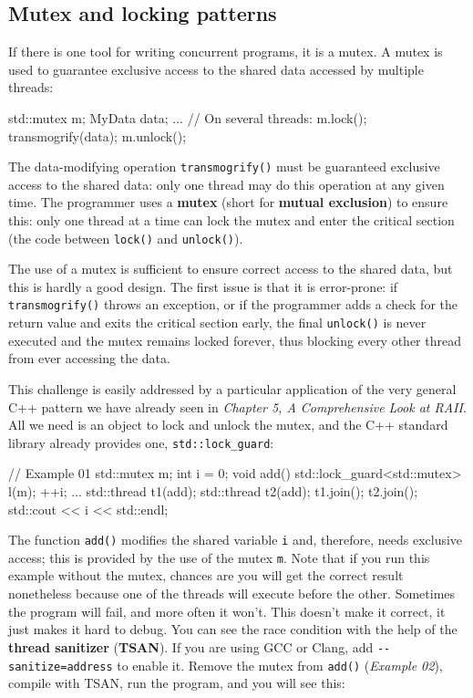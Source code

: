 \subsection{Mutex and locking patterns}

If there is one tool for writing concurrent programs, it is a mutex. A mutex is used to guarantee exclusive access to the shared data accessed by multiple threads:

\begin{code}
std::mutex m;
MyData data;
...
// On several threads:
m.lock();
transmogrify(data);
m.unlock();
\end{code}

The data-modifying operation \texttt{transmogrify()} must be guaranteed exclusive access to the shared data: only one thread may do this operation at any given time. The programmer uses a \textbf{mutex} (short for \textbf{mutual exclusion}) to ensure this: only one thread at a time can lock the mutex and enter the critical section (the code between \texttt{lock()} and \texttt{unlock()}).

The use of a mutex is sufficient to ensure correct access to the shared data, but this is hardly a good design. The first issue is that it is error-prone: if \texttt{transmogrify()} throws an exception, or if the programmer adds a check for the return value and exits the critical section early, the final \texttt{unlock()} is never executed and the mutex remains locked forever, thus blocking every other thread from ever accessing the data.

This challenge is easily addressed by a particular application of the very general C++ pattern we have already seen in \emph{Chapter 5, A Comprehensive Look at RAII}. All we need is an object to lock and unlock the mutex, and the C++ standard library already provides one, \texttt{std::lock\_guard}:

\begin{code}
// Example 01
std::mutex m;
int i = 0;
void add() {
  std::lock_guard<std::mutex> l(m);
  ++i;
}
...
std::thread t1(add);
std::thread t2(add);
t1.join();
t2.join();
std::cout << i << std::endl;
\end{code}

The function \texttt{add()} modifies the shared variable \texttt{i} and, therefore, needs exclusive access; this is provided by the use of the mutex \texttt{m}. Note that if you run this example without the mutex, chances are you will get the correct result nonetheless because one of the threads will execute before the other. Sometimes the program will fail, and more often it won't. This doesn't make it correct, it just makes it hard to debug. You can see the race condition with the help of the \textbf{thread sanitizer} (\textbf{TSAN}). If you are using GCC or Clang, add \texttt{-\/-sanitize=address} to enable it. Remove the mutex from \texttt{add()} (\emph{Example 02}), compile with TSAN, run the program, and you will see this:

